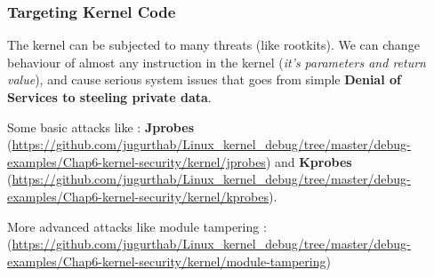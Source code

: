     			 
\begin{center}
\end{center}
\subsubsection{Targeting Kernel Code}
The kernel can be subjected to many threats (like rootkits).
We can change behaviour of almost any instruction in the kernel (\textit{it's parameters and return value}), and cause
serious system issues that goes from simple \textbf{Denial of Services to steeling private data}.

Some basic attacks like : \textbf{Jprobes} ({\color{blue}\url{https://github.com/jugurthab/Linux_kernel_debug/tree/master/debug-examples/Chap6-kernel-security/kernel/jprobes}}) and \textbf{Kprobes} ({\color{blue}\url{https://github.com/jugurthab/Linux\_kernel\_debug/tree/master/debug-examples/Chap6-kernel-security/kernel/kprobes}}).


More advanced attacks like module tampering : ({\color{blue}\url{https://github.com/jugurthab/Linux_kernel_debug/tree/master/debug-examples/Chap6-kernel-security/kernel/module-tampering}})



